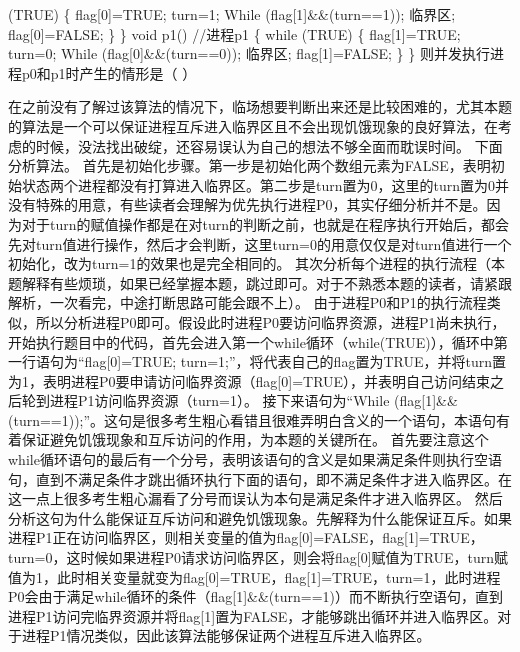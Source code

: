 (TRUE) \{ flag{[}0{]}=TRUE; turn=1; While (flag{[}1{]}\&\&(turn==1));
临界区; flag{[}0{]}=FALSE; \} \} void p1() //进程p1 \{ while (TRUE) \{
flag{[}1{]}=TRUE; turn=0; While (flag{[}0{]}\&\&(turn==0)); 临界区;
flag{[}1{]}=FALSE; \} \} 则并发执行进程p0和p1时产生的情形是（ ）
\par{}
\begin{solution}在之前没有了解过该算法的情况下，临场想要判断出来还是比较困难的，尤其本题的算法是一个可以保证进程互斥进入临界区且不会出现饥饿现象的良好算法，在考虑的时候，没法找出破绽，还容易误认为自己的想法不够全面而耽误时间。
下面分析算法。
首先是初始化步骤。第一步是初始化两个数组元素为FALSE，表明初始状态两个进程都没有打算进入临界区。第二步是turn置为0，这里的turn置为0并没有特殊的用意，有些读者会理解为优先执行进程P0，其实仔细分析并不是。因为对于turn的赋值操作都是在对turn的判断之前，也就是在程序执行开始后，都会先对turn值进行操作，然后才会判断，这里turn=0的用意仅仅是对turn值进行一个初始化，改为turn=1的效果也是完全相同的。
其次分析每个进程的执行流程（本题解释有些烦琐，如果已经掌握本题，跳过即可。对于不熟悉本题的读者，请紧跟解析，一次看完，中途打断思路可能会跟不上）。
由于进程P0和P1的执行流程类似，所以分析进程P0即可。假设此时进程P0要访问临界资源，进程P1尚未执行，开始执行题目中的代码，首先会进入第一个while循环（while(TRUE)），循环中第一行语句为``flag{[}0{]}=TRUE;
turn=1;''，将代表自己的flag置为TRUE，并将turn置为1，表明进程P0要申请访问临界资源（flag{[}0{]}=TRUE），并表明自己访问结束之后轮到进程P1访问临界资源（turn=1）。
接下来语句为``While
(flag{[}1{]}\&\&(turn==1));''。这句是很多考生粗心看错且很难弄明白含义的一个语句，本语句有着保证避免饥饿现象和互斥访问的作用，为本题的关键所在。
首先要注意这个while循环语句的最后有一个分号，表明该语句的含义是如果满足条件则执行空语句，直到不满足条件才跳出循环执行下面的语句，即不满足条件才进入临界区。在这一点上很多考生粗心漏看了分号而误认为本句是满足条件才进入临界区。
然后分析这句为什么能保证互斥访问和避免饥饿现象。先解释为什么能保证互斥。如果进程P1正在访问临界区，则相关变量的值为flag{[}0{]}=FALSE，flag{[}1{]}=TRUE，turn=0，这时候如果进程P0请求访问临界区，则会将flag{[}0{]}赋值为TRUE，turn赋值为1，此时相关变量就变为flag{[}0{]}=TRUE，flag{[}1{]}=TRUE，turn=1，此时进程P0会由于满足while循环的条件（flag{[}1{]}\&\&(turn==1)）而不断执行空语句，直到进程P1访问完临界资源并将flag{[}1{]}置为FALSE，才能够跳出循环并进入临界区。对于进程P1情况类似，因此该算法能够保证两个进程互斥进入临界区。

\end{solution}
